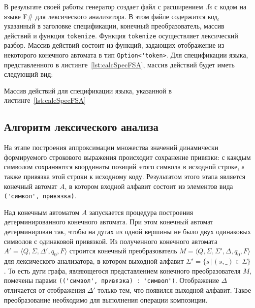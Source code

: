\documentclass[10pt, conference, compsocconf]{IEEEtran}
\begin{document}
В результате своей работы генератор создает файл с расширением .fs с кодом на языке F\# для лексического анализатора. В этом файле содержится код, указанный в заголовке спецификации, конечный преобразователь, массив действий и функция \verb|tokenize|. Функция \verb|tokenize| осуществляет лексический разбор.  Массив действий состоит из функций, задающих отображение из некоторого конечного автомата в тип \verb|Option<'token>|. Для спецификации языка, представленного в листинге~\ref{lst:calcSpecFSA}, массив действий будет иметь следующий вид: 

\begin{listing}[h]
\begin{pyglist}
\end{pyglist}
\caption{Массив действий для спецификации языка, указанной в листинге~\ref{lst:calcSpecFSA}}
\label{lst:actFunc}
\end{listing}


\subsection{Алгоритм лексического анализа}
На этапе построения аппроксимации множества значений динамически формируемого строкового выражения происходит сохранение привязки: с каждым символом сохраняются координаты позиций этого символа в исходной строке, а также привязка этой строки к исходному коду. Результатом этого этапа является конечный автомат $A$, в котором входной алфавит состоит из элементов вида \verb|('символ', привязка)|.

Над конечным автоматом $A$ запускается процедура построения детерминированного конечного автомата. При этом конечный автомат детерминирован так, чтобы на дугах из одной вершины не было двух одинаковых символов с одинаковой привязкой. Из полученного конечного автомата  $A' = \langle Q, \Sigma, \Delta', q_0, F \rangle$ строится конечный преобразователь  $M = \langle Q, \Sigma, \Sigma', \Delta, q_0, F \rangle$  для лексического анализатора, в котором выходной алфавит $\Sigma'= \{s~|(s,\_) \in \Sigma \}$. То есть дуги графа, являющегося представлением конечного преобразователя $M$, помечены парами \verb|(('символ', привязка) : 'символ')|. Отображение $\Delta$  отличается от отображения $\Delta'$ только тем, что появился выходной алфавит. Такое преобразование необходимо для выполнения операции композиции. 
\end{document}
